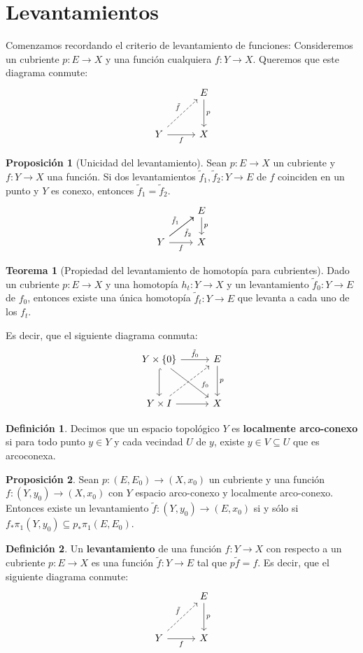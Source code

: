 \documentclass[spanish]{article}
\theoremstyle{definition}
\newtheorem*{defn}{Definición}
\newtheorem*{teo}{Teorema}
\newtheorem*{prop}{Proposición}
\begin{document}
\section{Levantamientos}
	Comenzamos recordando el criterio de levantamiento de funciones:
Consideremos un cubriente $p: E\to X$ y una función cualquiera $f:Y\to X$. Queremos que este diagrama conmute:
\[\begin{tikzcd}[column sep=1cm,row sep=1cm]
	& E\arrow[d,"p"]\\
	Y\arrow[ur,dashed,"\tilde{f}"]\arrow[r,swap,"f"]&X
\end{tikzcd}\]
\begin{prop}[Unicidad del levantamiento]
	Sean $p: E\to X$ un cubriente y $f:Y\to X$ una función. Si dos levantamientos $\tilde{f}_1,\tilde{f}_2:Y\to E$ de $f$ coinciden en un punto y $Y$ es conexo, entonces $\tilde{f}_1=\tilde{f}_2$.
	\[\begin{tikzcd}
		& E\arrow[d,"p"]\\
		Y\arrow[ru,"\tilde{f}_1"]\arrow[ru,swap,"\tilde{f}_2"]\arrow[r,swap,"f"]&X
	\end{tikzcd}\]
\end{prop}
\begin{teo}[Propiedad del levantamiento de homotopía para cubrientes]\label{teo-lhc}
	Dado un cubriente $p: E\to X$ y una homotopía $h_t:Y\to X$ y un levantamiento $\tilde{f}_0:Y\to  E$ de $f_0$, entonces existe una única homotopía $\tilde{f}_t:Y\to  E$ que levanta a cada uno de los $f_t$.
	
	Es decir, que el siguiente diagrama conmuta:
	\[\begin{tikzcd}[column sep=1cm,row sep=1cm]
		Y\times\{0\}\arrow[r,"\tilde{f}_0"]\arrow[rd,"f_0" near end]\arrow[d,hook]& E\arrow[d,"p"]\\
		Y\times I\arrow[r]\arrow[ru,dashed]&X
	\end{tikzcd}\]
\end{teo}
\begin{defn}
	Decimos que un espacio topológico $Y$ es \textbf{localmente arco-conexo} si para todo punto $y\in Y$ y cada vecindad $U$ de $y$, existe $y\in V\subseteq U$ que es arcoconexa.
\end{defn}
\begin{prop}
	Sean $p:( E, E_0)\to (X,x_0)$ un cubriente y una función $f:(Y,y_0)\to (X,x_0)$ con $Y$ espacio arco-conexo y localmente arco-conexo. Entonces existe un levantamiento $\tilde{f}:(Y,y_0)\to( E,x_0)$ si y sólo si $f_*\pi_1(Y,y_0)\subseteq p_*\pi_1( E, E_0)$.
\end{prop}
\begin{defn}
	Un \textbf{levantamiento} de una función $f:Y\to X$ con respecto a un cubriente $p: E\to X$ es una función $\tilde{f}:Y\to E$ tal que $p\tilde{f}=f$. Es decir, que el siguiente diagrama conmute:
	\[\begin{tikzcd}[column sep=1cm,row sep=1cm]
		& E\arrow[d,"p"]\\
		Y\arrow[ur,dashed,"\tilde{f}"]\arrow[r,swap,"f"]&X
	\end{tikzcd}\]
\end{defn}
\end{document}
